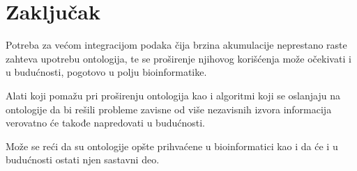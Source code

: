\section{Zaključak}

Potreba za većom integracijom podaka čija brzina akumulacije neprestano raste zahteva upotrebu ontologija, te se proširenje njihovog korišće\-nja može očekivati i u budućnosti, pogotovo u polju bioinformatike.

Alati koji pomažu pri proširenju ontologija kao i algoritmi koji se oslanjaju na ontologije da bi rešili probleme zavisne od više nezavisnih izvora informacija verovatno će takođe napredovati u budućnosti. 

Može se reći da su ontologije opšte prihvaćene u bioinformatici kao i da će i u budućnosti ostati njen sastavni deo.